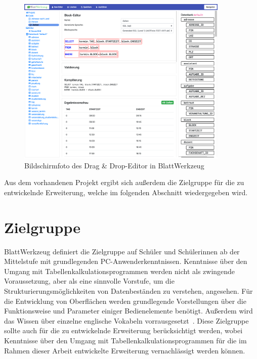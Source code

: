 \begin{figure}
    \centering
    \includegraphics[width=0.9\textwidth]{gfx/requirements-existing-draganddrop.png}
    \caption{Bildschirmfoto des Drag \& Drop-Editor in BlattWerkzeug}
    \label{fig:requirements:existing:draganddrop}
\end{figure}

Aus dem vorhandenen Projekt ergibt sich außerdem die Zielgruppe für die zu entwickelnde Erweiterung, welche im folgenden Abschnitt wiedergegeben wird.

\section{Zielgruppe}
\label{sec:requirements:target}

BlattWerkzeug definiert die Zielgruppe auf Schüler und Schülerinnen ab der Mittelstufe mit grundlegenden PC-Anwenderkenntnissen. Kenntnisse über den Umgang mit Tabellenkalkulationsprogrammen werden nicht als zwingende Voraussetzung, aber als eine sinnvolle Vorstufe, um die Strukturierungsmöglichkeiten von Datenbeständen zu verstehen, angesehen. Für die Entwicklung von Oberflächen werden grundlegende Vorstellungen über die Funktionsweise und Parameter einiger Bedienelemente benötigt. Außerdem wird das Wissen über einzelne englische Vokabeln vorrausgesetzt~\cite[22-23]{riemer2016}. Diese Zielgruppe sollte auch für die zu entwickelnde Erweiterung berücksichtigt werden, wobei Kenntnisse über den Umgang mit Tabellenkalkulationsprogrammen für die im Rahmen dieser Arbeit entwickelte Erweiterung vernachlässigt werden können.

